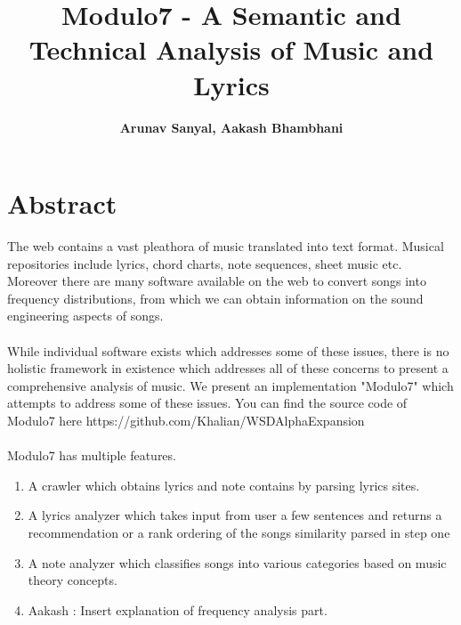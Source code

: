 \documentclass[letterpaper, 11pt]{article}
\begin{document}
\title{Modulo7 - A Semantic and Technical Analysis of Music and Lyrics
\\} 
\author{\textbf{Arunav Sanyal, Aakash Bhambhani}}
\maketitle

\section*{Abstract}
The web contains a vast pleathora of music translated into text format. Musical repositories include lyrics, chord charts, note sequences, sheet music etc. Moreover there are many software available on the web to convert songs into frequency distributions, from which we can obtain information on the sound engineering aspects of songs.\\\\
While individual software exists which addresses some of these issues, there is no holistic framework in existence which addresses all of these concerns to present a comprehensive analysis of music. We present an implementation "Modulo7" which attempts to address some of these issues. You can find the source code of Modulo7 here https://github.com/Khalian/WSDAlphaExpansion \\\\
Modulo7 has multiple features. 
\begin{enumerate}
\item A crawler which obtains lyrics and note contains by parsing lyrics sites.
\item A lyrics analyzer which takes input from user a few sentences and returns a recommendation or a rank ordering of the songs similarity parsed in step one 
\item A note analyzer which classifies songs into various categories based on music theory concepts.
\item Aakash : Insert explanation of frequency analysis part. 
\end{enumerate} 
\end{document}
